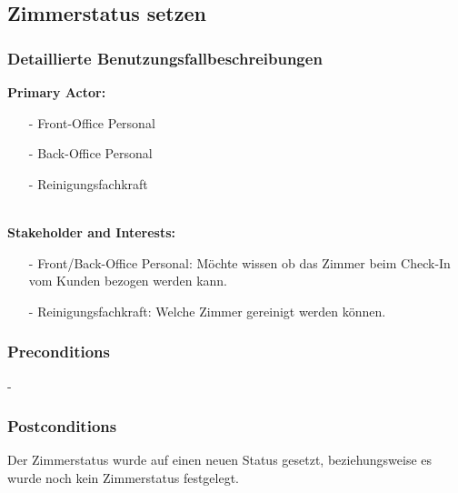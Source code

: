\documentclass[./detailed_overview_usecases.tex]{subfiles}
\begin{document}
    \subsection{Zimmerstatus setzen}
    \subsubsection{Detaillierte Benutzungsfallbeschreibungen}
    \textbf{Primary Actor:}
    \begin{itemize}
        \item[-] Front-Office Personal
        \item[-] Back-Office Personal
        \item[-] Reinigungsfachkraft
    \end{itemize}
    \\
    \textbf{Stakeholder and Interests:}
    \begin{itemize}
        \item[-] Front/Back-Office Personal: Möchte wissen ob das Zimmer beim Check-In vom Kunden bezogen werden kann.
        \item[-] Reinigungsfachkraft: Welche Zimmer gereinigt werden können.
    \end{itemize}

    \subsubsection*{Preconditions}
    -
    \subsubsection*{Postconditions}
    Der Zimmerstatus wurde auf einen neuen Status gesetzt, beziehungsweise es wurde noch kein Zimmerstatus festgelegt.
\end{document}
